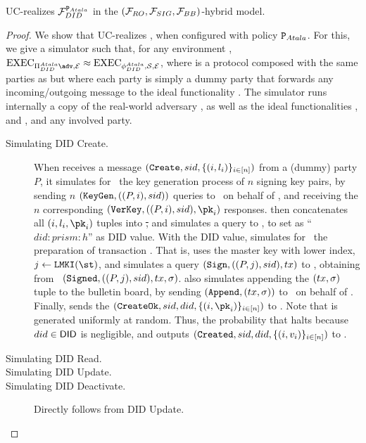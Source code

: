 
\begin{theorem}
  \label{thm:sec-didatala}
  \RealPKIDIDAtala UC-realizes $\IdealFPKIDID^{\P_{Atala}}$ in the $(\IdealFRO,
  \IdealFSig, \IdealFaobb)$-hybrid model.
\end{theorem}

\begin{proof}
  We show that \RealPKIDIDAtala UC-realizes \IdealFPKIDID, when configured
  with policy $\P_{Atala}$. For this, we give a simulator \Sim such that, for
  any environment \Env, $\Exec_{\RealPKIDIDAtala\adv,\Env} \approx
  \Exec_{\phiDIDAtala,\Sim,\Env}$,
  where \phiDIDAtala is a protocol composed with the same parties as
  \RealPKIDIDAtala but where each party is simply a dummy party that forwards
  any incoming/outgoing message to the ideal functionality \IdealFPKIDID. The
  simulator \Sim runs internally a copy of the real-world adversary \adv, as
  well as the ideal functionalities \IdealFRO, \IdealFSig and \IdealFaobb,
  and any involved party.

  \begin{description}
  \item[Simulating DID Create.] %
    When \Sim receives a message $(\uccmd{Create},\sid,\lbrace (i,\lbl_i)
    \rbrace_{i\in[n]})$ from a (dummy) party $P$, it simulates for \adv~the key
    generation process of $n$ signing key pairs, by sending $n$
    $(\uccmd{KeyGen},((P,i),\sid))$ queries to \adv~on
    behalf of \IdealFSig, and receiving the $n$ corresponding $(\uccmd{VerKey},
    ((P,i),\sid),\pk_i)$ responses.
    \Sim then concatenates all $(i,\lbl_i,\pk_i)$ tuples into \st, and simulates
    a query to \IdealFRO {}, to set
    \did as ``$did:prism: h$'' as DID value.
    With the DID value, \Sim simulates for \adv~the preparation of transaction
    \tx. That is, \Sim uses the master key with lower index, $j \gets
    \LMKI(\st)$, and simulates a query $(\uccmd{Sign},((P,j),\sid),\tx)$ to
    \IdealFSig, obtaining from \adv~$(\uccmd{Signed},((P,j),\sid),\tx,\sig)$.
    \Sim also simulates appending the $(\tx,\sig)$ tuple to the bulletin board,
    by sending $(\uccmd{Append},(\tx,\sig))$ to \adv~on behalf of \IdealFaobb.
    Finally, \Sim sends the $(\uccmd{CreateOk},\sid,\did,\lbrace (i,\pk_i)
    \rbrace_{i\in[n]})$ to \IdealFPKIDID.
    Note that \did is generated uniformly at random. Thus, the probability that
    \IdealFPKIDID halts because $\did \in \DID$ is negligible, and \IdealFPKIDID
    outputs $(\uccmd{Created},\sid,\did,\lbrace (i,\val_i) \rbrace_{i\in[n]})$
    to \Sim.
  \item[Simulating DID Read.]
  \item[Simulating DID Update.] 
  \item[Simulating DID Deactivate.] Directly follows from DID Update.      
  \end{description}
\end{proof}


